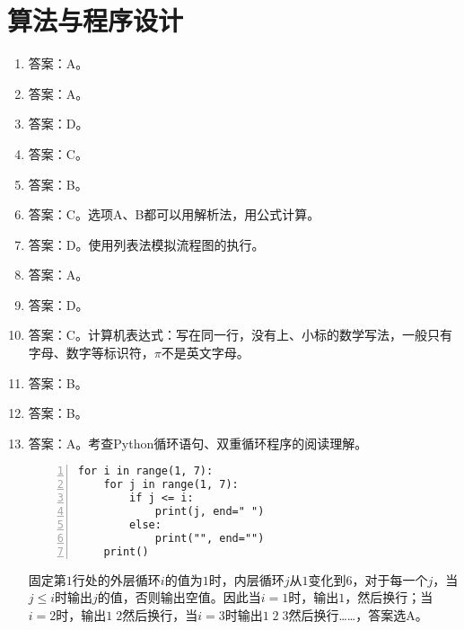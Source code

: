 \section{算法与程序设计}

\begin{enumerate}
\item 答案：A。

\item 答案：A。

\item 答案：D。

\item 答案：C。

\item 答案：B。

\item 答案：C。选项A、B都可以用解析法，用公式计算。

\item 答案：D。使用列表法模拟流程图的执行。

\item 答案：A。

\item 答案：D。

\item 答案：C。计算机表达式：写在同一行，没有上、小标的数学写法，一般只有字母、数字等标识符，$\pi$不是英文字母。

\item 答案：B。

\item 答案：B。

\item 答案：A。考查Python循环语句、双重循环程序的阅读理解。
\begin{paracol}{2}
\begin{lstlisting}[numbers=left]
for i in range(1, 7):
    for j in range(1, 7):
        if j <= i:
            print(j, end=" ")
        else:
            print("", end="")
    print()
\end{lstlisting}
\switchcolumn
固定第$1$行处的外层循环$i$的值为$1$时，内层循环$j$从$1$变化到$6$，对于每一个$j$，当$j \le i$时输出$j$的值，否则输出空值。因此当$i=1$时，输出$1$，然后换行；当$i=2$时，输出$1 \; 2$然后换行，当$i=3$时输出$1 \; 2 \; 3$然后换行……，答案选A。
\end{paracol}


\end{enumerate}
